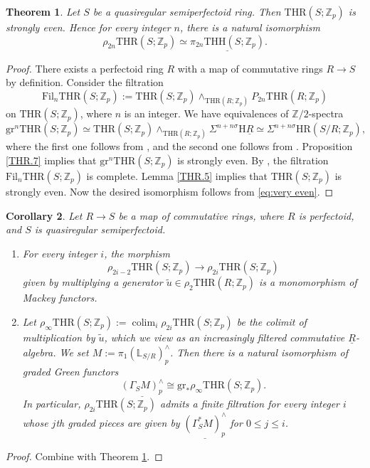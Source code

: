 \documentclass[10pt]{amsart}
\newtheorem{thm}{Theorem}[section]
\newtheorem{cor}[thm]{Corollary}
\theoremstyle{definition}
\numberwithin{equation}{section}
\renewcommand{\L}{\mathbb{L}}
\newcommand{\Z}{\mathbb{Z}}
\newcommand{\rH}{\mathrm{H}}
\newcommand{\ul}{\underline}
\newcommand{\gr}{\mathrm{gr}}
\newcommand{\Fil}{\mathrm{Fil}}
\newcommand{\colim}{\mathop{\mathrm{colim}}}
\newcommand{\HR}{\mathrm{HR}}
\newcommand{\THH}{\mathrm{THH}}
\newcommand{\THR}{\mathrm{THR}}
\begin{document}
{\begin{thm}
\label{THR.6}
Let $S$ be a quasiregular semiperfectoid ring.
Then $\THR(S;\Z_p)$ is strongly even.
Hence for every integer $n$,
there is a natural isomorphism
\[
\rho_{2n}\THR(S;\Z_p)
\simeq
\ul{\pi_{2n}\THH(S;\Z_p)}.
\]
\end{thm}
\begin{proof}
There exists a perfectoid ring $R$ with a map of commutative rings $R\to S$ by definition.
Consider the filtration
\[
\Fil_n \THR(S;\Z_p):=\THR(S;\Z_p)\wedge_{\THR(R;\Z_p)}P_{2n} \THR(R;\Z_p)
\]
on $\THR(S;\Z_p)$,
where $n$ is an integer.
We have equivalences of $\Z/2$-spectra
\[
\gr^n \THR(S;\Z_p)
\simeq
\THR(S;\Z_p)\wedge_{\THR(R;\Z_p)}\Sigma^{n+n\sigma} \rH \ul{R}
\simeq
\Sigma^{n+n\sigma}\HR(S/R;\Z_p),
\]
where the first one follows from \cite[Theorem 5.15]{HP}, and the second one follows from \cite[Theorem 5.16]{HP}.
Proposition \ref{THR.7} implies that $\gr^n \THR(S;\Z_p)$ is strongly even.
By \cite[Lemma 4.22]{HP},
the filtration $\Fil_n\THR(S;\Z_p)$ is complete.
Lemma \ref{THR.5} implies that $\THR(S;\Z_p)$ is strongly even.
Now the desired isomorphism follows from \eqref{eq:very even}.
\end{proof}




\begin{cor}\label{moreonqrsperfd}
Let $R\to S$ be a map of commutative rings,
where $R$ is perfectoid,
and $S$ is quasiregular semiperfectoid.
\begin{enumerate}
\item[\textup{(1)}]
For every integer $i$,
the morphism
\[
\rho_{2i-2}\THR(S;\Z_p)
\to
\rho_{2i}\THR(S;\Z_p)
\]
given by multiplying a generator $\tilde{u}\in \rho_2\THR(R;\Z_p)$ is a monomorphism of Mackey functors.
\item[\textup{(2)}]
Let $\rho_{\infty}\THR(S;\Z_p):=\colim_i \rho_{2i}\THR(S;\Z_p)$ be the colimit of multiplication by $\tilde{u}$,
which we view as an increasingly filtered commutative $\ul{R}$-algebra.
We set $M:=\pi_1(\L_{S/R})_p^\wedge$.
Then there is a natural isomorphism of graded Green functors
\[
\ul{(\Gamma_S M)_p^\wedge}
\cong
\gr_* \rho_{\infty}\THR(S;\Z_p).
\]
In particular,
$\rho_{2i}\THR(S;\Z_p)$ admits a finite filtration for every integer $i$ whose $j$th graded pieces are given by $\ul{(\Gamma_S^* M)_p^\wedge}$ for $0\leq j\leq i$.
\end{enumerate}
\end{cor}
\begin{proof}
Combine \cite[Theorem 7.1(2),(3)]{BMS19} with Theorem \ref{THR.6}.
\end{proof}
 

}
\end{document}
